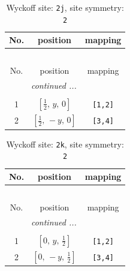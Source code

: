 \documentclass[fleqn,8pt]{jsarticle}
\begin{document}
\renewcommand{\arraystretch}{1.2}
\begin{longtable}{ccc}
\caption{Wyckoff site: {\tt 2j}, site symmetry: {\tt 2}}
 \\
 \hline \hline
No. & position & mapping \\ \hline \endfirsthead

\multicolumn{2}{l}{\tablename\ \thetable{}} \\
 \hline \hline
No. & position & mapping \\ \hline \endhead

 \hline \hline
\multicolumn{2}{r}{\footnotesize\it continued ...} \\ \endfoot

 \hline \hline
\multicolumn{2}{r}{} \\ \endlastfoot

1 & $\left[ \frac{1}{2},\, y,\, 0 \right]$ & {\tt [1,2]} \\ \hline
2 & $\left[ \frac{1}{2},\, - y,\, 0 \right]$ & {\tt [3,4]} \\
\end{longtable}
\renewcommand{\arraystretch}{1.2}
\begin{longtable}{ccc}
\caption{Wyckoff site: {\tt 2k}, site symmetry: {\tt 2}}
 \\
 \hline \hline
No. & position & mapping \\ \hline \endfirsthead

\multicolumn{2}{l}{\tablename\ \thetable{}} \\
 \hline \hline
No. & position & mapping \\ \hline \endhead

 \hline \hline
\multicolumn{2}{r}{\footnotesize\it continued ...} \\ \endfoot

 \hline \hline
\multicolumn{2}{r}{} \\ \endlastfoot

1 & $\left[ 0,\, y,\, \frac{1}{2} \right]$ & {\tt [1,2]} \\ \hline
2 & $\left[ 0,\, - y,\, \frac{1}{2} \right]$ & {\tt [3,4]} \\
\end{longtable}
\renewcommand{\arraystretch}{1.2}
\end{document}
